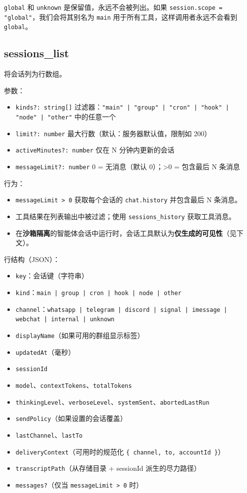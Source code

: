\texttt{global} 和 \texttt{unknown} 是保留值，永远不会被列出。如果 \texttt{session.scope = "global"}，我们会将其别名为 \texttt{main} 用于所有工具，这样调用者永远不会看到 \texttt{global}。

\subsection{sessions\_list}


将会话列为行数组。

参数：

\begin{itemize}
  \item \texttt{kinds?: string[]} 过滤器：\texttt{"main" | "group" | "cron" | "hook" | "node" | "other"} 中的任意一个
  \item \texttt{limit?: number} 最大行数（默认：服务器默认值，限制如 200）
  \item \texttt{activeMinutes?: number} 仅在 N 分钟内更新的会话
  \item \texttt{messageLimit?: number} 0 = 无消息（默认 0）；>0 = 包含最后 N 条消息
\end{itemize}


行为：

\begin{itemize}
  \item \texttt{messageLimit > 0} 获取每个会话的 \texttt{chat.history} 并包含最后 N 条消息。
  \item 工具结果在列表输出中被过滤；使用 \texttt{sessions\_history} 获取工具消息。
  \item 在\textbf{沙箱隔离}的智能体会话中运行时，会话工具默认为\textbf{仅生成的可见性}（见下文）。
\end{itemize}


行结构（JSON）：

\begin{itemize}
  \item \texttt{key}：会话键（字符串）
  \item \texttt{kind}：\texttt{main | group | cron | hook | node | other}
  \item \texttt{channel}：\texttt{whatsapp | telegram | discord | signal | imessage | webchat | internal | unknown}
  \item \texttt{displayName}（如果可用的群组显示标签）
  \item \texttt{updatedAt}（毫秒）
  \item \texttt{sessionId}
  \item \texttt{model}、\texttt{contextTokens}、\texttt{totalTokens}
  \item \texttt{thinkingLevel}、\texttt{verboseLevel}、\texttt{systemSent}、\texttt{abortedLastRun}
  \item \texttt{sendPolicy}（如果设置的会话覆盖）
  \item \texttt{lastChannel}、\texttt{lastTo}
  \item \texttt{deliveryContext}（可用时的规范化 \texttt{\{ channel, to, accountId \}}）
  \item \texttt{transcriptPath}（从存储目录 + sessionId 派生的尽力路径）
  \item \texttt{messages?}（仅当 \texttt{messageLimit > 0} 时）
\end{itemize}


